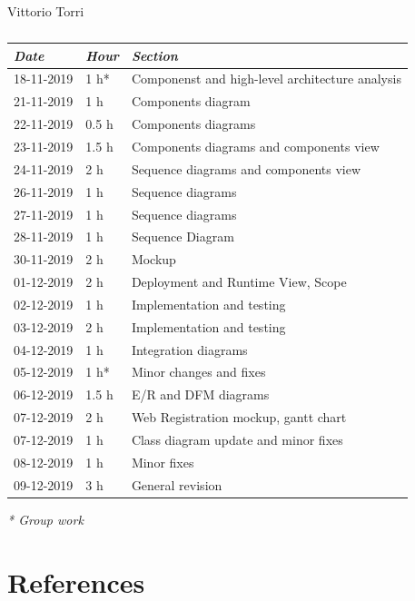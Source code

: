 \documentclass[a4paper]{report}
\begin{document}
\begin{table}[H]
\centering
Vittorio Torri \\
\begin{tabular}{p{2cm}p{1.5cm}p{7cm}}
\toprule
\textit{Date} & \textit{Hour} & \textit{Section} \\ \midrule
18-11-2019 & 1 h* & Componenst and high-level architecture analysis \\ \midrule
21-11-2019 & 1 h  & Components diagram \\ \midrule
22-11-2019 & 0.5 h & Components diagrams \\ \midrule
23-11-2019 & 1.5 h & Components diagrams and components view\\ \midrule
24-11-2019 & 2 h & Sequence diagrams and components view \\ \midrule
26-11-2019 & 1 h & Sequence diagrams \\ \midrule
27-11-2019 & 1 h & Sequence diagrams \\ \midrule
28-11-2019 & 1 h & Sequence Diagram \\ \midrule
30-11-2019 & 2 h & Mockup \\ \midrule
01-12-2019 & 2 h & Deployment and Runtime View, Scope \\ \midrule
02-12-2019 & 1 h & Implementation and testing \\ \midrule
03-12-2019 & 2 h & Implementation and testing \\ \midrule
04-12-2019 & 1 h & Integration diagrams \\ \midrule
05-12-2019 & 1 h* & Minor changes and fixes \\ \midrule
06-12-2019 & 1.5 h & E/R and DFM diagrams \\ \midrule
07-12-2019 & 2 h & Web Registration mockup, gantt chart \\ \midrule
07-12-2019 & 1 h & Class diagram update and minor fixes \\ \midrule
08-12-2019 & 1 h & Minor fixes \\ \midrule
09-12-2019 & 3 h & General revision \\
\bottomrule
\end{tabular}
\caption[Vittorio Torri's effort table]{}
\end{table}
\textit{* Group work}

\chapter{References}
\end{document}
